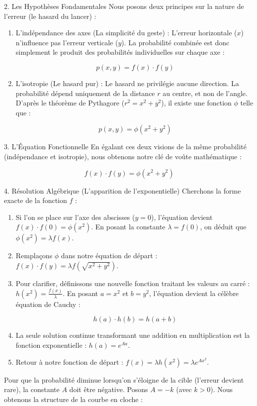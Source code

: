 \begin{proofbox}
2. Les Hypothèses Fondamentales
Nous posons deux principes sur la nature de l'erreur (le hasard du lancer) :
\begin{enumerate}
\item L'indépendance des axes (La simplicité du geste) : L'erreur horizontale ($x$) n'influence pas l'erreur verticale ($y$). La probabilité combinée est donc simplement le produit des probabilités individuelles sur chaque axe :

$$p(x,y) = f(x) \cdot f(y)$$



\item L'isotropie (Le hasard pur) : Le hasard ne privilégie aucune direction. La probabilité dépend uniquement de la distance $r$ au centre, et non de l'angle. D'après le théorème de Pythagore ($r^2 = x^2 + y^2$), il existe une fonction $\phi$ telle que :

$$p(x,y) = \phi(x^2 + y^2)$$



\end{enumerate}
3. L'Équation Fonctionnelle
En égalant ces deux visions de la même probabilité (indépendance et isotropie), nous obtenons notre clé de voûte mathématique :

$$f(x) \cdot f(y) = \phi(x^2 + y^2)$$


4. Résolution Algébrique (L'apparition de l'exponentielle)
Cherchons la forme exacte de la fonction $f$ :
\begin{enumerate}
\item Si l'on se place sur l'axe des abscisses ($y=0$), l'équation devient $f(x) \cdot f(0) = \phi(x^2)$. En posant la constante $\lambda = f(0)$, on déduit que $\phi(x^2) = \lambda f(x)$.
\item Remplaçons $\phi$ dans notre équation de départ : $f(x) \cdot f(y) = \lambda f(\sqrt{x^2 + y^2})$.
\item Pour clarifier, définissons une nouvelle fonction traitant les valeurs au carré : $h(x^2) = \frac{f(x)}{\lambda}$. En posant $a = x^2$ et $b = y^2$, l'équation devient la célèbre équation de Cauchy :

$$h(a) \cdot h(b) = h(a + b)$$



\item La seule solution continue transformant une addition en multiplication est la fonction exponentielle : $h(a) = e^{Aa}$.
\item Retour à notre fonction de départ : $f(x) = \lambda h(x^2) = \lambda e^{Ax^2}$.
\end{enumerate}
Pour que la probabilité diminue lorsqu'on s'éloigne de la cible (l'erreur devient rare), la constante $A$ doit être négative. Posons $A = -k$ (avec $k > 0$). Nous obtenons la structure de la courbe en cloche :


\end{proofbox}
